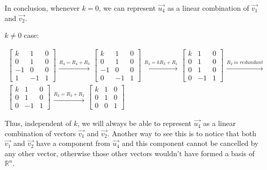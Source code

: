 \documentclass[11pt]{article}
\begin{document}
In conclusion, whenever \(k = 0\), we can represent \(\vec{u_4}\) as a linear
combination of \(\vec{v_1}\) and \(\vec{v_2}\).

\(k \neq 0\) case:

\begin{align*}
  \begin{bmatrix}
    k  & 1  & 0 \\
    0  & 1  & 0 \\
    -1 & 0  & 0 \\
    1  & -1 & 1
  \end{bmatrix}
  \begin{aligned} \xrightarrow{R_4 = R_4 + R_3} \end{aligned}
  \begin{bmatrix}
    k  & 1  & 0 \\
    0  & 1  & 0 \\
    -1 & 0  & 0 \\
    0  & -1 & 1
  \end{bmatrix}
  \begin{aligned} \xrightarrow{R_3 = kR_3 + R_1} \end{aligned}
  \begin{bmatrix}
    k & 1  & 0 \\
    0 & 1  & 0 \\
    0 & 1  & 0 \\
    0 & -1 & 1
  \end{bmatrix}
  \begin{aligned} \xrightarrow{R_2 \; \textit{is redundant}} \end{aligned} \\
  \begin{bmatrix}
    k & 1  & 0 \\
    0 & 1  & 0 \\
    0 & -1 & 1
  \end{bmatrix}
  \begin{aligned} \xrightarrow{R_3 = R_3 + R_2} \end{aligned}
  \begin{bmatrix}
    k & 1 & 0 \\
    0 & 1 & 0 \\
    0 & 0 & 1
  \end{bmatrix}
\end{align*}

Thus, independent of \(k\), we will always be able to represent \(\vec{u_4}\) as
a linear combination of vectors \(\vec{v_1}\) and \(\vec{v_2}\).  Another way to
see this is to notice that both \(\vec{v_1}\) and \(\vec{v_2}\) have a component
from \(\vec{u_4}\) and this component cannot be cancelled by any other vector,
otherwise those other vectors wouldn't have formed a basis of \(\mathbb{R}^n\).
\end{document}
